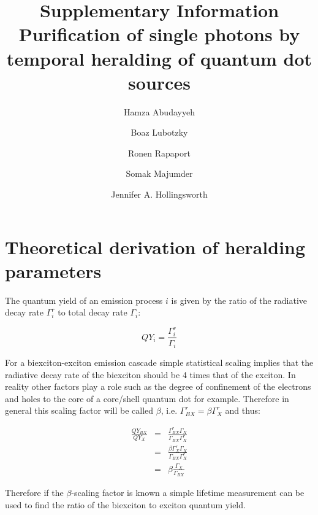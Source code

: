 \documentclass[reprint,onecolumn]{revtex4-1}
\begin{document}
\title{{\bf Supplementary Information} \protect\\ Purification of single photons by temporal heralding of quantum dot sources}

\author{Hamza Abudayyeh}%
\author{Boaz Lubotzky}
\author{Ronen Rapaport}
\author{Somak Majumder}
\author{Jennifer A. Hollingsworth}





\maketitle

\section{Theoretical derivation of heralding parameters}

The quantum yield of an emission process $i$ is given by the ratio
of the radiative decay rate $\Gamma_{i}^{r}$ to total decay rate
$\Gamma_{i}$:

\[
QY_{i}=\frac{\Gamma_{i}^{r}}{\Gamma_{i}}
\]

For a biexciton-exciton emission cascade simple statistical scaling
implies that the radiative decay rate of the biexciton should be 4
times that of the exciton. In reality other factors play a role such
as the degree of confinement of the electrons and holes to the core
of a core/shell quantum dot for example. Therefore in general this
scaling factor will be called $\beta$, i.e. $\Gamma_{BX}^{r}=\beta\Gamma_{X}^{r}$
and thus:

\[
\begin{array}{ccc}
\frac{QY_{BX}}{QY_{X}} & = & \frac{\Gamma_{BX}^{r}\Gamma_{X}}{\Gamma_{BX}\Gamma_{X}^{r}}\\
 & = & \frac{\beta\Gamma_{X}^{r}\Gamma_{X}}{\Gamma_{BX}\Gamma_{X}^{r}}\\
 & = & \beta\frac{\Gamma_{X}}{\Gamma_{BX}}
\end{array}
\]

Therefore if the $\beta$-scaling factor is known a simple lifetime
measurement can be used to find the ratio of the biexciton to exciton
quantum yield. 
\end{document}
